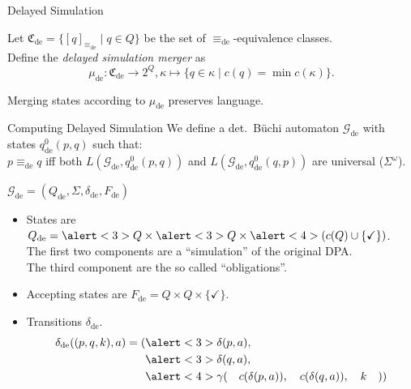 \begin{frame}{Delayed Simulation}
\begin{defn}
	Let $\mathfrak{C}_\text{de} = \{ [q]_{\equiv_\text{de}} \mid q \in Q \}$ be the set of $\equiv_\text{de}$-equivalence classes. \\
	Define the \emph{delayed simulation merger} as $$\mu_\text{de} : \mathfrak{C}_\text{de} \rightarrow 2^Q, \kappa \mapsto \{ q \in \kappa \mid c(q) = \min c(\kappa) \}.$$
\end{defn}

\begin{theorem}
	Merging states according to $\mu_\text{de}$ preserves language.
\end{theorem}
\end{frame}


\begin{frame}{Computing Delayed Simulation}
We define a det.\ Büchi automaton $\mathcal{G}_\text{de}$ with states $q_\text{de}^0(p, q)$ such that: \\
	$p \equiv_\text{de} q$ iff both $L(\mathcal{G}_\text{de}, q_\text{de}^0(p, q))$ and $L(\mathcal{G}_\text{de}, q_\text{de}^0(q, p))$ are universal ($\Sigma^\omega$).
	
	\pause
	\vspace{.6cm}

$\mathcal{G}_\text{de} = (Q_\text{de}, \Sigma, \delta_\text{de}, F_\text{de})$

\begin{itemize}
	\item States are $Q_\text{de} = \alert<3>{Q} \times \alert<3>{Q} \times \alert<4>{(c(Q) \cup \{\checkmark\})}$. \\
The first two components are a \enquote{simulation} of the original DPA. \\
The third component are the so called \enquote{obligations}.
	\item Accepting states are $F_\text{de} = Q \times Q \times \{\checkmark\}$.
	\item Transitions $\delta_\text{de}$.
\begin{align*}
	\delta_\text{de}((p, q, k), a) = (& \alert<3>{\delta(p, a)}, \\
									& \alert<3>{\delta(q, a)}, \\
									& \alert<4>{\gamma( \quad c(\delta(p, a)), \quad c(\delta(q, a)), \quad k \quad )})
\end{align*}
\end{itemize}

\end{frame}


